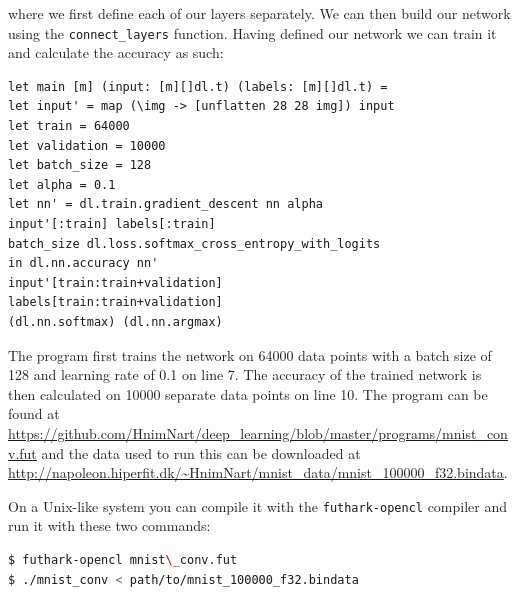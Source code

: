 where we first define each of our layers separately. 
We can then build our network using the \texttt{connect\_layers} function. 
Having defined our network we can train it and calculate the accuracy as such:
\begin{lstlisting}[language=futhark, caption = {Example of training a network w.
the library}]
let main [m] (input: [m][]dl.t) (labels: [m][]dl.t) =
let input' = map (\img -> [unflatten 28 28 img]) input
let train = 64000
let validation = 10000
let batch_size = 128
let alpha = 0.1
let nn' = dl.train.gradient_descent nn alpha
input'[:train] labels[:train]
batch_size dl.loss.softmax_cross_entropy_with_logits
in dl.nn.accuracy nn'
input'[train:train+validation]
labels[train:train+validation]
(dl.nn.softmax) (dl.nn.argmax)
\end{lstlisting} 
The program first trains the network on 64000 data points with a batch size of
128 and learning rate of 0.1 on line 7. 
The accuracy of the trained network is then calculated on 10000 separate data
points on line 10. 
The program can be found at 
\url{https://github.com/HnimNart/deep_learning/blob/master/programs/mnist_conv.fut}
and the data used to run this can be downloaded at
\url{http://napoleon.hiperfit.dk/~HnimNart/mnist_data/mnist\_100000\_f32.bindata}.

On a Unix-like system you can compile it with the \texttt{futhark-opencl}
compiler and run it with these two commands:
\begin{lstlisting}[language=bash, mathescape=false]
$ futhark-opencl mnist\_conv.fut 
$ ./mnist_conv < path/to/mnist_100000_f32.bindata
\end{lstlisting}


